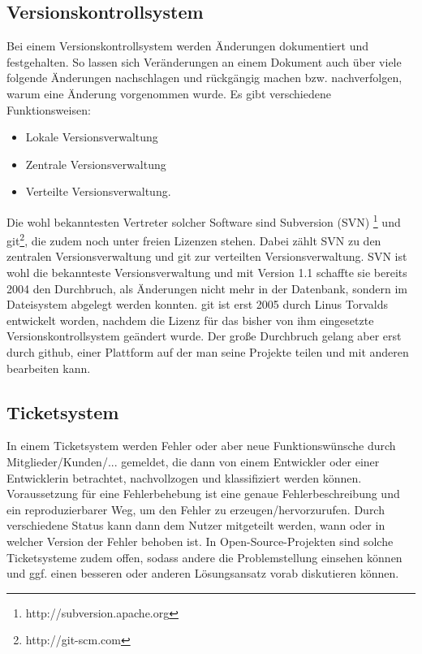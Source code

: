 \subsection{Versionskontrollsystem}
Bei einem Versionskontrollsystem werden Änderungen dokumentiert und
festgehalten. So lassen sich Veränderungen an einem Dokument auch
über viele folgende Änderungen nachschlagen und rückgängig machen bzw.
nachverfolgen, warum eine Änderung vorgenommen wurde.
Es gibt verschiedene Funktionsweisen:
\begin{itemize}
  \item Lokale Versionsverwaltung
  \item Zentrale Versionsverwaltung 
  \item Verteilte Versionsverwaltung. 
\end{itemize}
Die wohl bekanntesten Vertreter solcher Software sind Subversion (SVN)
\footnote{http://subversion.apache.org} und git\footnote{http://git-scm.com}, die
zudem noch unter freien Lizenzen stehen.
Dabei zählt SVN zu den zentralen Versionsverwaltung und git zur 
verteilten Versionsverwaltung.
SVN ist wohl die bekannteste Versionsverwaltung und mit Version 1.1 schaffte
sie bereits 2004 den Durchbruch, als Änderungen nicht mehr in der Datenbank, 
sondern im Dateisystem abgelegt werden konnten.
git ist erst 2005 durch Linus Torvalds entwickelt worden, nachdem die
Lizenz für das bisher von ihm eingesetzte Versionskontrollsystem geändert 
wurde. Der große Durchbruch gelang aber erst durch github, einer Plattform
auf der man seine Projekte teilen und mit anderen bearbeiten kann.

\subsection{Ticketsystem}
In einem Ticketsystem werden Fehler oder aber neue Funktionswünsche 
durch Mitglieder/Kunden/... gemeldet, die dann von einem Entwickler 
oder einer Entwicklerin betrachtet, nachvollzogen und klassifiziert
werden können. 
Voraussetzung für eine Fehlerbehebung ist eine genaue Fehlerbeschreibung 
und ein reproduzierbarer Weg, um den Fehler zu erzeugen/hervorzurufen.
Durch verschiedene Status kann dann dem Nutzer mitgeteilt werden, wann 
oder in welcher Version der Fehler behoben ist.
In Open-Source-Projekten sind solche Ticketsysteme zudem offen, sodass 
andere die Problemstellung einsehen können und ggf. einen besseren
oder anderen Lösungsansatz vorab diskutieren können.

